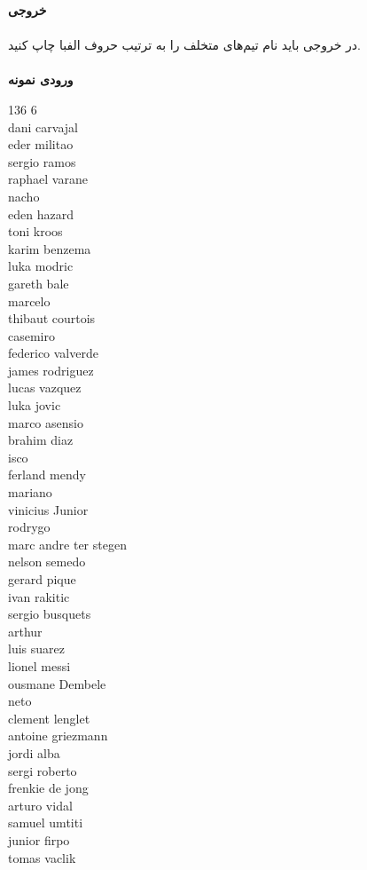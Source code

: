 \documentclass[]{article}
\newcommand{\inputsample}[1]{
    ~\\
    \textbf{ورودی نمونه}
    ~\\
    \begin{tcolorbox}[breakable,boxrule=0pt]
        \begin{latin}
            \large{
                #1
            }
        \end{latin}
    \end{tcolorbox}
}
\begin{document}
\textbf{خروجی}
\\\\
در خروجی باید نام تیم‌های متخلف را به ترتیب حروف الفبا چاپ کنید.\\
\inputsample{
136 6\\
dani carvajal\\
eder militao\\
sergio ramos\\
raphael varane\\
nacho\\
eden hazard\\
toni kroos\\
karim benzema\\
luka modric\\
gareth bale\\
marcelo\\
thibaut courtois\\
casemiro\\
federico valverde\\
james rodriguez\\
lucas vazquez\\
luka jovic\\
marco asensio\\
brahim diaz\\
isco\\
ferland mendy\\
mariano\\
vinicius Junior\\
rodrygo\\
marc andre ter stegen\\
nelson semedo\\
gerard pique\\
ivan rakitic\\
sergio busquets\\
arthur\\
luis suarez\\
lionel messi\\
ousmane Dembele\\
neto\\
clement lenglet\\
antoine griezmann\\
jordi alba\\
sergi roberto\\
frenkie de jong\\
arturo vidal\\
samuel umtiti\\
junior firpo\\
tomas vaclik\\
}
\end{document}
